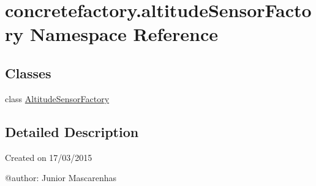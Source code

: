 \hypertarget{namespaceconcretefactory_1_1altitudeSensorFactory}{}\section{concretefactory.\+altitude\+Sensor\+Factory Namespace Reference}
\label{namespaceconcretefactory_1_1altitudeSensorFactory}
\subsection*{Classes}
\begin{DoxyCompactItemize}
\item 
class \hyperlink{classconcretefactory_1_1altitudeSensorFactory_1_1AltitudeSensorFactory}{Altitude\+Sensor\+Factory}
\end{DoxyCompactItemize}


\subsection{Detailed Description}
\begin{DoxyVerb}Created on 17/03/2015

@author: Junior Mascarenhas
\end{DoxyVerb}
 